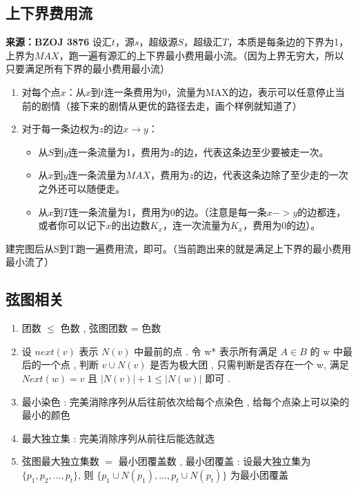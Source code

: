 \documentclass[landscape, oneside, a4paper, cs4size]{book}
\begin{document}
\begin{multicols}{2}
\begin{spacing}{0.72}
\begin{spacing}{0.50}
\begin{spacing}{0.5}
						\subsection*{上下界费用流}
						\noindent \textbf{来源：BZOJ 3876}
						\noindent 设汇$t$，源$s$，超级源$S$，超级汇$T$，本质是每条边的下界为1，上界为$MAX$，跑一遍有源汇的上下界最小费用最小流。（因为上界无穷大，所以只要满足所有下界的最小费用最小流）
						\begin{enumerate}
							\item 对每个点$x$：从$x$到$t$连一条费用为0，流量为MAX的边，表示可以任意停止当前的剧情（接下来的剧情从更优的路径去走，画个样例就知道了）
							\item 对于每一条边权为$z$的边$x \rightarrow y$：
								\begin{itemize}
									\item 从$S$到$y$连一条流量为1，费用为$z$的边，代表这条边至少要被走一次。
									\item 从$x$到$y$连一条流量为$MAX$，费用为$z$的边，代表这条边除了至少走的一次之外还可以随便走。
									\item 从$x$到$T$连一条流量为1，费用为0的边。（注意是每一条$x->y$的边都连，或者你可以记下$x$的出边数$K_x$，连一次流量为$K_x$，费用为0的边）。
								\end{itemize}
						\end{enumerate}
						建完图后从S到T跑一遍费用流，即可。（当前跑出来的就是满足上下界的最小费用最小流了）
						\subsection*{弦图相关}
						\begin{enumerate}
							\item[1.] 团数 $\leq$ 色数 , 弦图团数 = 色数
							\item[2.] 设 $next(v)$ 表示 $N(v)$ 中最前的点 .
								令 w* 表示所有满足 $A \in B$ 的 w 中最后的一个点 ,
								判断 $v \cup N(v)$ 是否为极大团 ,
								只需判断是否存在一个 w,
								满足 $Next(w)=v$ 且 $|N(v)| + 1 \leq |N(w)|$ 即可 .
							\item[3.] 最小染色 : 完美消除序列从后往前依次给每个点染色 ,
								给每个点染上可以染的最小的颜色
							\item[4.] 最大独立集 : 完美消除序列从前往后能选就选
							\item[5.] 弦图最大独立集数 $=$ 最小团覆盖数 ,
								最小团覆盖 :
								设最大独立集为 $\{p_1,p_2, \dots ,p_t\}$,
								则 $\{p_1\cup N(p_1), \dots , p_t \cup N(p_t)\}$
								为最小团覆盖
						\end{enumerate}

\end{spacing}
\end{spacing}
\end{spacing}
\end{multicols}
\end{document}
